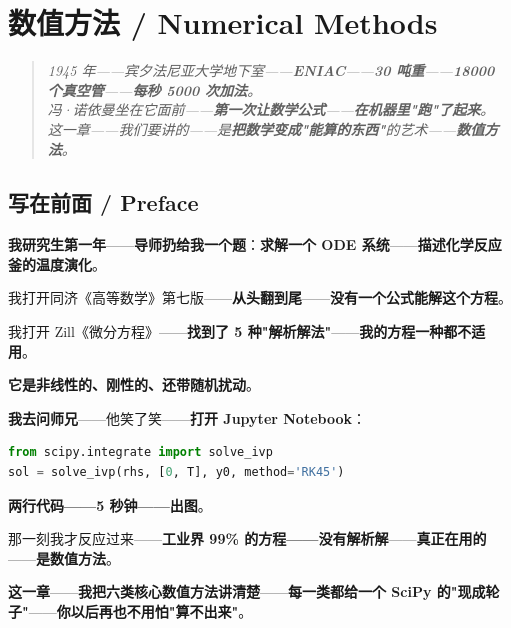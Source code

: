 
\chapter{数值方法 / Numerical Methods}
\label{ch:numerical}

\begin{quote}\itshape
1945 年——宾夕法尼亚大学地下室——\textbf{ENIAC}——\textbf{30 吨重}——\textbf{18000 个真空管}——\textbf{每秒 5000 次加法}。\\
冯·诺依曼坐在它面前——\textbf{第一次让数学公式}——\textbf{在机器里"跑"了起来}。\\
这一章——我们要讲的——是\textbf{把数学变成"能算的东西"}的艺术——\textbf{数值方法}。
\end{quote}

\section{写在前面 / Preface}

\textbf{我研究生第一年}——\textbf{导师扔给我一个题}：\textbf{求解一个 ODE 系统}——\textbf{描述化学反应釜的温度演化}。

我打开同济《高等数学》第七版——\textbf{从头翻到尾}——\textbf{没有一个公式能解这个方程}。

我打开 Zill《微分方程》——\textbf{找到了 5 种"解析解法"}——\textbf{我的方程一种都不适用}。

\textbf{它是非线性的、刚性的、还带随机扰动}。

\textbf{我去问师兄}——他笑了笑——\textbf{打开 Jupyter Notebook}：

\begin{lstlisting}[language=Python]
from scipy.integrate import solve_ivp
sol = solve_ivp(rhs, [0, T], y0, method='RK45')
\end{lstlisting}

\textbf{两行代码——5 秒钟——出图}。

那一刻我才反应过来——\textbf{工业界 99\% 的方程——没有解析解}——\textbf{真正在用的}——\textbf{是数值方法}。

\textbf{这一章}——\textbf{我把六类核心数值方法讲清楚}——\textbf{每一类都给一个 SciPy 的"现成轮子"}——\textbf{你以后再也不用怕"算不出来"}。

